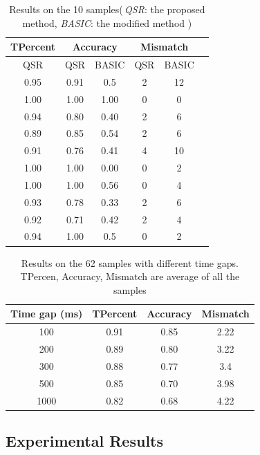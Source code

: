 \documentclass[letterpaper]{article}
\begin{document}
\begin{table}[t!]\small
\centering
\begin{tabular}{c|c|c|c|c|c}
\hline
{TPercent} & \multicolumn{2}{c}{Accuracy} & \multicolumn{2}{c}{Mismatch}\\
\hline
QSR  & QSR & BASIC & QSR & BASIC\\
\hline
0.95& 0.91 & 0.5 & 2 & 12\\
1.00&1.00 & 1.00 & 0 & 0\\
0.94&0.80 & 0.40 & 2 & 6\\
0.89&0.85 & 0.54 & 2 & 6\\
0.91&0.76 & 0.41 & 4 & 10\\
1.00&1.00 & 0.00 & 0 & 2\\
1.00&1.00 & 0.56 & 0 & 4\\
0.93&0.78 & 0.33 & 2 & 6 \\
0.92&0.71 & 0.42 & 2 & 4\\
0.94&1.00 & 0.5 & 0 & 2\\
\hline
\end{tabular}
\vspace{-2mm}
\caption{Results on the 10 samples(\,\emph{QSR}: the proposed method, \emph{BASIC}: the modified method )}\label{empiResults}
\vspace{-4mm}
\end{table}

\begin{table}[t!]\small

\centering
\begin{tabular}{c|c|c|c}
\hline
Time gap (ms) & TPercent & Accuracy & Mismatch\\
\hline
100 & 0.91 & 0.85 & 2.22\\
200 & 0.89 & 0.80 & 3.22\\
300 & 0.88 & 0.77 & 3.4\\
500 & 0.85 & 0.70 & 3.98\\
1000 & 0.82 & 0.68 & 4.22\\
\hline
\end{tabular}
\vspace{-2mm}
\caption{Results on the 62 samples with different time gaps. TPercen, Accuracy, Mismatch are average of all the samples }\label{empiResults_2}
\vspace{-8mm}
\end{table}


\subsection{Experimental Results}
\end{document}
